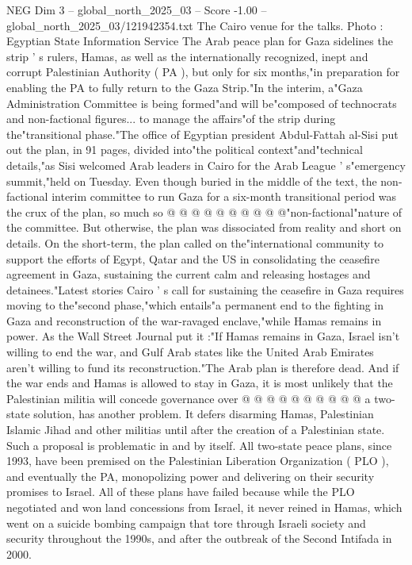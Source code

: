 \begin{textsample}{NEG Dim 3 – global\_north\_2025\_03 – Score -1.00 – global\_north\_2025\_03/121942354.txt}  \label{ex:f3_neg_431}
The Cairo venue for the talks.
Photo : Egyptian State Information Service The Arab peace plan for Gaza sidelines the strip ' s rulers, Hamas, as well as the internationally recognized, inept and corrupt Palestinian Authority ( PA ), but only for six months,"in preparation for enabling the PA to fully return to the Gaza Strip."In the interim, a"Gaza Administration Committee is being formed"and will be"composed of technocrats and non-factional figures... to manage the affairs"of the strip during the"transitional phase."The office of Egyptian president Abdul-Fattah al-Sisi put out the plan, in 91 pages, divided into"the political context"and"technical details,"as Sisi welcomed Arab leaders in Cairo for the Arab League ' s"emergency summit,"held on Tuesday.
Even though buried in the middle of the text, the non-factional interim committee to run Gaza for a six-month transitional period was the crux of the plan, so much so @ @ @ @ @ @ @ @ @ @"non-factional"nature of the committee.
But otherwise, the plan was dissociated from reality and short on details.
On the short-term, the plan called on the"international community to support the efforts of Egypt, Qatar and the US in consolidating the ceasefire agreement in Gaza, sustaining the current calm and releasing hostages and detainees."Latest stories Cairo ' s call for sustaining the ceasefire in Gaza requires moving to the"second phase,"which entails"a permanent end to the fighting in Gaza and reconstruction of the war-ravaged enclave,"while Hamas remains in power.
As the Wall Street Journal put it :"If Hamas remains in Gaza, Israel isn't willing to end the war, and Gulf Arab states like the United Arab Emirates aren't willing to fund its reconstruction."The Arab plan is therefore dead.
And if the war ends and Hamas is allowed to stay in Gaza, it is most unlikely that the Palestinian militia will concede governance over @ @ @ @ @ @ @ @ @ @ a two-state solution, has another problem.
It defers disarming Hamas, Palestinian Islamic Jihad and other militias until after the creation of a Palestinian state.
Such a proposal is problematic in and by itself.
All two-state peace plans, since 1993, have been premised on the Palestinian Liberation Organization ( PLO ), and eventually the PA, monopolizing power and delivering on their security promises to Israel.
All of these plans have failed because while the PLO negotiated and won land concessions from Israel, it never reined in Hamas, which went on a suicide bombing campaign that tore through Israeli society and security throughout the 1990s, and after the outbreak of the Second Intifada in 2000.

\end{textsample}
